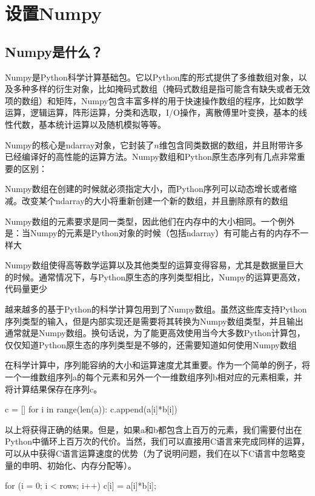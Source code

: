 \chapter{设置Numpy}\label{sec:broadcasting}
\section{Numpy是什么？}
Numpy是Python科学计算基础包。它以Python库的形式提供了多维数组对象，以及多种多样的衍生对象，比如掩码式数组（掩码式数组是指可能含有缺失或者无效项的数组）和矩阵，Numpy包含丰富多样的用于快速操作数组的程序，比如数学运算，逻辑运算，阵形运算，分类和选取，I/O操作，离散傅里叶变换，基本的线性代数，基本统计运算以及随机模拟等等。

Numpy的核心是ndarray对象，它封装了$n$维包含同类数据的数组，并且附带许多已经编译好的高性能的运算方法。Numpy数组和Python原生态序列有几点非常重要的区别：
\begin{compactitem}
	\item Numpy数组在创建的时候就必须指定大小，而Python序列可以动态增长或者缩减。改变某个ndarray的大小将重新创建一个新的数组，并且删除原有的数组
	\item Numpy数组的元素要求是同一类型，因此他们在内存中的大小相同。一个例外是：当Numpy的元素是Python对象的时候（包括ndarray）有可能占有的内存不一样大
	\item Numpy数组使得高等数学运算以及其他类型的运算变得容易，尤其是数据量巨大的时候。通常情况下，与Python原生态的序列类型相比，Numpy的运算更高效，代码量更少
	\item 越来越多的基于Python的科学计算包用到了Numpy数组。虽然这些库支持Python序列类型的输入，但是内部实现还是需要将其转换为Numpy数组类型，并且输出通常就是Numpy数组。换句话说，为了能更高效使用当今大多数Python计算包，仅仅知道Python原生态的序列类型是不够的，还需要知道如何使用Numpy数组
\end{compactitem}

在科学计算中，序列能容纳的大小和运算速度尤其重要。作为一个简单的例子，将一个一维数组序列a的每个元素和另外一个一维数组序列b相对应的元素相乘，并将计算结果保存在序列c。
\begin{python}
c = []
for i in range(len(a)):
c.append(a[i]*b[i])
\end{python}

以上将获得正确的结果。但是，如果a和b都包含上百万的元素，我们需要付出在Python中循环上百万次的代价。当然，我们可以直接用C语言来完成同样的运算，可以从中获得C语言运算速度的优势（为了说明问题，我们在以下C语言中忽略变量的申明、初始化、内存分配等）。
\begin{python}
for (i = 0; i < rows; i++){
c[i] = a[i]*b[i];
}
\end{python}

